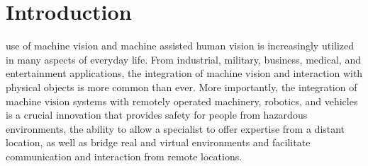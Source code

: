 \documentclass[12pt, journal]{IEEEtran}
\begin{document}
%





\section{Introduction}
 use of machine vision and machine assisted human vision is increasingly utilized in many aspects of everyday life.  From industrial, military, business, medical, and entertainment applications, the integration of machine vision and interaction with physical objects is more common than ever.  More importantly, the integration of machine vision systems with remotely operated machinery, robotics, and vehicles is a crucial innovation that provides safety for people from hazardous environments, the ability to allow a specialist to offer expertise from a distant location, as well as bridge real and virtual environments and facilitate communication and interaction from remote locations.
\end{document}
